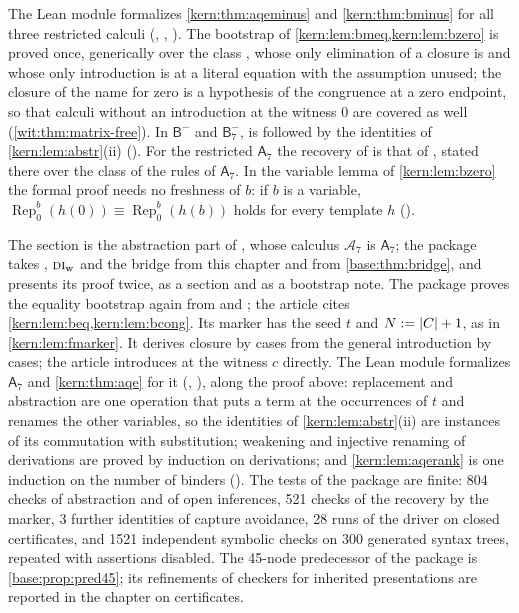 The Lean module  formalizes
\cref{kern:thm:aqeminus} and \cref{kern:thm:bminus} for all three restricted
calculi (, ,
).  The bootstrap of
\cref{kern:lem:bmeq,kern:lem:bzero} is proved once, generically over the class
, whose only elimination of a closure is  and
whose only introduction is  at a literal equation with the
assumption unused; the closure of the name for zero is a hypothesis of the
congruence at a zero endpoint, so that calculi without an introduction at the
witness $0$ are covered as well (\cref{wit:thm:matrix-free}).  In $\mathsf{B}^{-}$ and $\mathsf{B}^{-}_{7}$,  is
 followed by the identities of \cref{kern:lem:abstr}(ii)
().  For the restricted $\mathsf{A}_7$ the recovery of
 is that of , stated there over the class
 of the rules of $\mathsf{A}_7$.  In the variable lemma of
\cref{kern:lem:bzero} the formal proof needs no freshness of $b$: if $b$ is a
variable, $\operatorname{Rep}_{0}^{b}(h(0))\equiv\operatorname{Rep}_{0}^{b}(h(b))$
holds for every template $h$ ().

\begin{remark}[Sources]
\label{kern:rem:aqe-sources}
The section is the abstraction part of ,
whose calculus $\mathcal{A}_7$ is $\mathsf{A}_7$; the package takes
, $\rulename{DI}_{\mathrm{w}}$ and the bridge from this
chapter and from \cref{base:thm:bridge}, and presents its proof twice, as a
section and as a bootstrap note.  The package proves the equality bootstrap
again from  and ; the article cites
\cref{kern:lem:beq,kern:lem:bcong}.  Its marker has the seed $t$ and
$N\mathrel{:=}|C|+1$, as in \cref{kern:lem:fmarker}.  It derives closure by cases
from the general introduction by cases; the article introduces at the
witness $c$ directly.  The Lean module  formalizes
$\mathsf{A}_7$ and \cref{kern:thm:aqe} for it (,
), along the proof above: replacement and abstraction
are one operation that puts a term at the occurrences of $t$ and renames the
other variables, so the identities of \cref{kern:lem:abstr}(ii) are instances
of its commutation with substitution; weakening and injective renaming of
derivations are proved by induction on derivations; and
\cref{kern:lem:aqerank} is one induction on the number of binders
().  The
tests of the package are finite: 804 checks of abstraction and of open
inferences, 521 checks of the recovery by the marker, 3 further identities
of capture avoidance, 28 runs of the driver on closed certificates, and
1521 independent symbolic checks on 300 generated syntax trees, repeated
with assertions disabled.  The 45-node predecessor of the package is
\cref{base:prop:pred45}; its refinements of checkers for inherited
presentations are reported in the chapter on certificates.
\end{remark}

